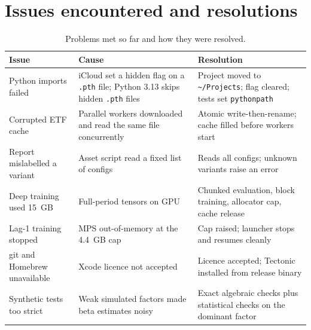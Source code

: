 \documentclass[11pt,a4paper]{article}
\newcommand{\code}[1]{\texttt{#1}}
\begin{document}
\begin{table}[ht]
\centering
\caption{Best validation net Sharpe per ensemble member and trading year, for both execution lags.
These are maxima over epochs and therefore optimistic; they are not trading results.}
\label{tab:folds}
\small

\end{table}

\section{Issues encountered and resolutions}
\label{sec:issues}

\begin{table}[ht]
\centering
\caption{Problems met so far and how they were resolved.}
\label{tab:issues}
\small
\begin{tabular}{@{}>{\raggedright\arraybackslash}p{}>{\raggedright\arraybackslash}p{}>{\raggedright\arraybackslash}p{}@{}}
\toprule
Issue & Cause & Resolution \\
\midrule
Python imports failed & iCloud set a hidden flag on a \code{.pth} file; Python 3.13 skips hidden \code{.pth} files & Project moved to \code{\textasciitilde/Projects}; flag cleared; tests set \code{pythonpath} \\
Corrupted ETF cache & Parallel workers downloaded and read the same file concurrently & Atomic write-then-rename; cache filled before workers start \\
Report mislabelled a variant & Asset script read a fixed list of configs & Reads all configs; unknown variants raise an error \\
Deep training used 15~GB & Full-period tensors on GPU & Chunked evaluation, block training, allocator cap, cache release \\
Lag-1 training stopped & MPS out-of-memory at the 4.4~GB cap & Cap raised; launcher stops and resumes cleanly \\
git and Homebrew unavailable & Xcode licence not accepted & Licence accepted; Tectonic installed from release binary \\
Synthetic tests too strict & Weak simulated factors made beta estimates noisy & Exact algebraic checks plus statistical checks on the dominant factor \\
\bottomrule
\end{tabular}
\end{table}
\end{document}
